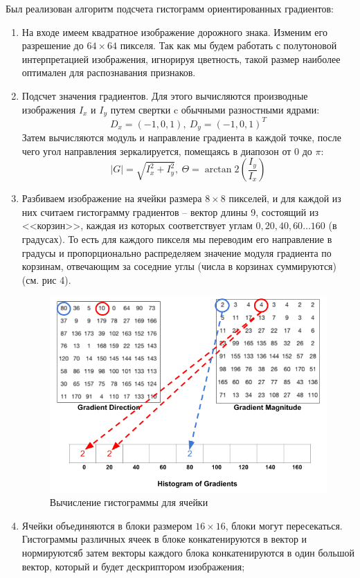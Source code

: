 \documentclass[a4paper, 12pt]{article}
\begin{document}
Был реализован алгоритм подсчета гистограмм ориентированных градиентов:
\begin{enumerate}
	\item На входе имеем квадратное изображение дорожного знака. Изменим его разрешение до $64\times64$ пикселя. Так как мы будем работать с полутоновой интерпретацией изображения, игнорируя цветность, такой размер наиболее оптимален для распознавания признаков.
	 \item Подсчет значения градиентов. Для этого вычисляются производные изображения $I_x$ и $I_y$ путем свертки c обычными разностными ядрами:
	 \[
	 D_x=(-1, 0, 1), \ D_y=(-1, 0, 1)^T
	 \]
	 Затем вычисляются модуль и направление градиента в каждой точке, после чего угол направления зеркалируется, помещаясь в диапозон от 0 до $\pi$:
	 \[
	 |G|=\sqrt{I_x^2+I_y^2}, \ \Theta=\arctan2\left(\frac{I_y}{I_x}\right)
	 \]
	 \item Разбиваем изображение на ячейки размера $8\times8$ пикселей, и для каждой из них считаем гистограмму градиентов -- вектор длины 9, состоящий из <<корзин>>, каждая из которых соответствует углам $0, 20, 40, 60 \dots 160$ (в градусах). То есть для каждого пикселя мы переводим его направление в градусы и пропорционально распределяем значение модуля градиента по корзинам, отвечающим за соседние углы (числа в корзинах суммируются) (см. рис 4).
	 
	 \begin{figure}
	 	\centering
	 	\includegraphics[scale = 0.5]{hog-histogram-1.png}
	 	\caption{Вычисление гистограммы для ячейки}
	 \end{figure}
 
	 \item Ячейки объединяются в блоки размером $16\times 16$, блоки могут пересекаться.
	 Гистограммы различных ячеек в блоке конкатенируются в вектор и нормируютсяб затем векторы каждого блока конкатенируются в один большой вектор, который и будет дескриптором изображения;
\end{enumerate}
\end{document}
